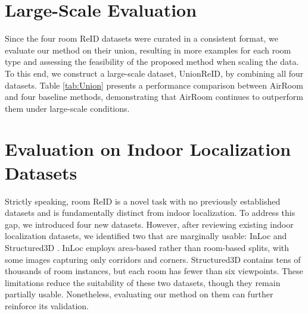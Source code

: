 \section{Large-Scale Evaluation}
Since the four room ReID datasets were curated in a consistent format, we evaluate our method on their union, resulting in more examples for each room type and assessing the feasibility of the proposed method when scaling the data. To this end, we construct a large-scale dataset, UnionReID, by combining all four datasets. Table \ref{tab:Union} presents a performance comparison between AirRoom and four baseline methods, demonstrating that AirRoom continues to outperform them under large-scale conditions.

\begin{table}[h]
\centering
{}
\caption{Comparison with baseline models on UnionReID to evaluate AirRoom's performance under data scaling.}
\label{tab:Union}
\end{table}

\section{Evaluation on Indoor Localization Datasets}
Strictly speaking, room ReID is a novel task with no previously established datasets and is fundamentally distinct from indoor localization. To address this gap, we introduced four new datasets. However, after reviewing existing indoor localization datasets, we identified two that are marginally usable: InLoc  \cite{taira2018inlocindoorvisuallocalization} and Structured3D \cite{Structured3D}. InLoc \cite{taira2018inlocindoorvisuallocalization} employs area-based rather than room-based splits, with some images capturing only corridors and corners. Structured3D \cite{Structured3D} contains tens of thousands of room instances, but each room has fewer than six viewpoints. These limitations reduce the suitability of these two datasets, though they remain partially usable. Nonetheless, evaluating our method on them can further reinforce its validation.

